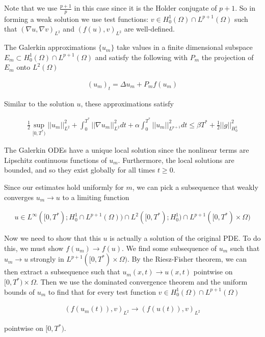 \documentclass[12pt, letterpaper]{article}
\begin{document}
\begin{enumerate}
\begin{enumerate}
Note that we use $\frac{p+1}{p}$ in this case since it is the Holder conjugate of $p+1$. So in forming a weak solution we use test functions: $v\in H_0^1(\Omega)\cap L^{p+1}(\Omega)$ such that $(\nabla u, \nabla v)_{L^2}$ and $(f(u),v)_{L^2}$ are well-defined.

The Galerkin approximations $\{u_m\}$ take values in a finite dimensional subspace $E_m\subset H_0^1(\Omega)\cap L^{p+1}(\Omega)$ and satisfy the following with $P_m$ the projection of $E_m$ onto $L^2(\Omega)$

\begin{align}
(u_m)_t=\Delta u_m + P_m f(u_m)
\end{align}

Similar to the solution $u$, these approximations satisfy

\begin{align}
\frac{1}{2}\sup_{[0,T^*)}||u_m||^2_{L^2} + \int_0^{T^*}||\nabla u_m||^2_{L^2}dt +\alpha\int_0^{T^*}||u_m||_{L^{p+1}}^2dt \le\beta T^*+\frac{1}{2}||g||^2_{H_0^1}
\end{align}

The Galerkin ODEs have a unique local solution since the nonlinear terms are Lipschitz continuous functions of $u_m$. Furthermore, the local solutions are bounded, and so they exist globally for all times $t\ge0$.

Since our estimates hold uniformly for $m$, we can pick a subsequence that weakly converges $u_m\rightarrow u$ to a limiting function

\begin{align}
u\in L^\infty([0,T^*);H_0^1\cap L^{p+1}(\Omega))\cap L^2([0,T^*);H^1_0)\cap L^{p+1}([0,T^*)\times\Omega)
\end{align}

Now we need to show that this $u$ is actually a solution of the original PDE. To do this, we must show $f(u_m)\rightarrow f(u)$. We find some subsequence of $u_m$ such that $u_m\rightarrow u$ strongly in $L^{p+1}([0,T^*)\times\Omega)$. By the Riesz-Fisher theorem, we can then extract a subsequence such that $u_m(x,t)\rightarrow u(x,t)$ pointwise on $[0,T^*)\times\Omega$. Then we use the dominated convergence theorem and the uniform bounds of $u_m$ to find that for every test function $v\in H_0^1(\Omega)\cap L^{p+1}(\Omega)$

\begin{align}
(f(u_m(t)),v)_{L^2}\rightarrow(f(u(t)),v)_{L^2}
\end{align}

pointwise on $[0,T^*)$.


\end{enumerate}
\end{enumerate}
\end{document}
